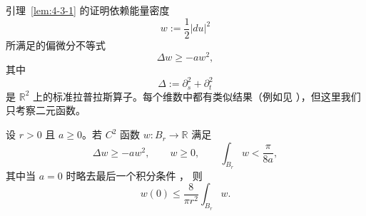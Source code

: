 引理~\ref{lem:4-3-1} 的证明依赖能量密度
\[
  w:=\frac12|du|^2
\]
所满足的偏微分不等式
\[
  \Delta w\ge-aw^2,
\]
其中
\[
  \Delta:=\partial_s^2+\partial_t^2
\]
是 $\mathbb R^2$ 上的标准拉普拉斯算子。每个维数中都有类似结果（例如见
），但这里我们只考察二元函数。

\begin{lemma}\label{lem:4-3-3}
设 $r>0$ 且 $a\ge0$。若 $C^2$ 函数 $w:B_r\to\mathbb R$ 满足
\begin{equation}\label{eq:4-3-1}
  \Delta w\ge-aw^2,
  \qquad
  w\ge0,
  \qquad
  \int_{B_r}w<\frac{\pi}{8a},
\end{equation}
其中当 $a=0$ 时略去最后一个积分条件
，
则
\begin{equation}\label{eq:4-3-2}
  w(0)\le\frac{8}{\pi r^2}\int_{B_r}w.
\end{equation}
\end{lemma}

